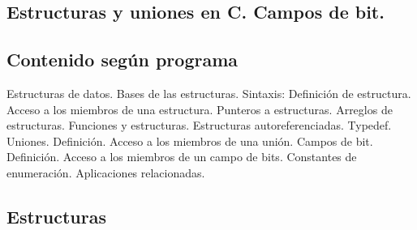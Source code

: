 \setcounter{subsection}{9}
\subsection*{Estructuras y uniones en C. Campos de bit.}
\subsection*{Contenido según programa}
Estructuras de datos. Bases de las estructuras. Sintaxis: Definición de estructura. Acceso a los miembros de una estructura. Punteros a estructuras. Arreglos de estructuras. Funciones y estructuras. Estructuras autoreferenciadas. Typedef.  Uniones. Definición. Acceso a los miembros de una unión. Campos de bit. Definición.  Acceso a los miembros de un campo de bits. Constantes de enumeración.  Aplicaciones relacionadas.

\subsection*{Estructuras}

